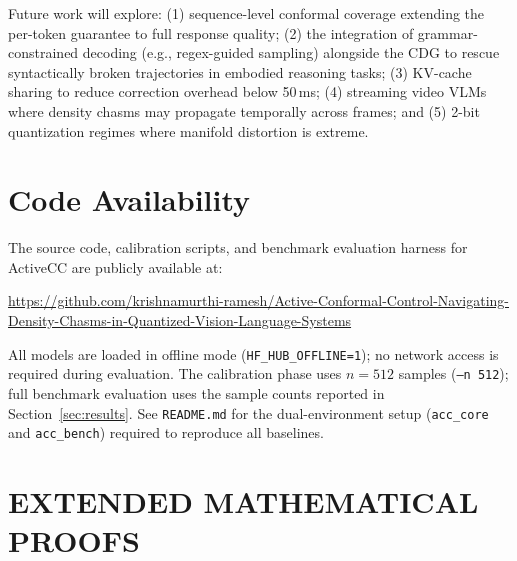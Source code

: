 \documentclass{ieeetmlcn}
\begin{document}
Future work will explore: (1) sequence-level conformal coverage
extending the per-token guarantee to full response quality; (2) the integration of grammar-constrained decoding (e.g., regex-guided sampling) alongside the CDG to rescue syntactically broken trajectories in embodied reasoning tasks; (3) KV-cache
sharing to reduce correction overhead below 50\,ms; (4) streaming video
VLMs where density chasms may propagate temporally across frames; and
(5) 2-bit quantization regimes where manifold distortion is extreme.



\section*{Code Availability}
The source code, calibration scripts, and benchmark evaluation harness for ActiveCC are publicly available at:
\begin{center}
\url{https://github.com/krishnamurthi-ramesh/Active-Conformal-Control-Navigating-Density-Chasms-in-Quantized-Vision-Language-Systems}
\end{center}
All models are loaded in offline mode (\texttt{HF\_HUB\_OFFLINE=1}); no network access is required during evaluation. The calibration phase uses $n=512$ samples (\texttt{--n 512}); full benchmark evaluation uses the sample counts reported in Section~\ref{sec:results}. See \texttt{README.md} for the dual-environment setup (\texttt{acc\_core} and \texttt{acc\_bench}) required to reproduce all baselines.

\appendices

\section{EXTENDED MATHEMATICAL PROOFS}
\label{app:proofs}
\end{document}
